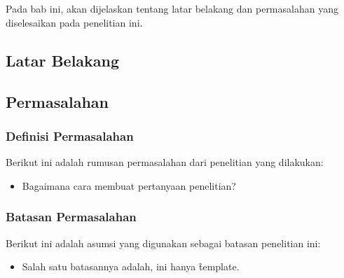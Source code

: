 \chapter{\babSatu}
\label{bab:1}
Pada bab ini, akan dijelaskan tentang latar belakang dan permasalahan yang diselesaikan pada penelitian ini.


\section{Latar Belakang}
\label{sec:latarBelakang}

\section{Permasalahan}
\label{sec:masalah}

\subsection{Definisi Permasalahan}
\label{sec:definisiMasalah}
Berikut ini adalah rumusan permasalahan dari penelitian yang dilakukan:
\begin{itemize}
	\item Bagaimana cara membuat pertanyaan penelitian?
\end{itemize}


\subsection{Batasan Permasalahan}
\label{sec:batasanMasalah}
Berikut ini adalah asumsi yang digunakan sebagai batasan penelitian ini:
\begin{itemize}
	\item Salah satu batasannya adalah, ini hanya \f{template}.
\end{itemize}


